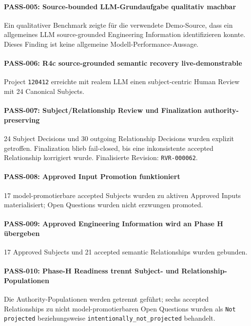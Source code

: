\paragraph{PASS-005: Source-bounded LLM-Grundaufgabe qualitativ machbar}
Ein qualitativer Benchmark zeigte für die verwendete Demo-Source, dass ein
allgemeines LLM source-grounded Engineering Information identifizieren konnte.
Dieses Finding ist keine allgemeine Modell-Performance-Aussage.

\paragraph{PASS-006: R4c source-grounded semantic recovery live-demonstrable}
Project \texttt{120412} erreichte mit realem LLM einen subject-centric Human Review
mit 24 Canonical Subjects.

\paragraph{PASS-007: Subject/Relationship Review und Finalization authority-preserving}
24 Subject Decisions und 30 outgoing Relationship Decisions wurden explizit
getroffen. Finalization blieb fail-closed, bis eine inkonsistente accepted
Relationship korrigiert wurde. Finalisierte Revision: \texttt{RVR-000062}.

\paragraph{PASS-008: Approved Input Promotion funktioniert}
17 model-promotierbare accepted Subjects wurden zu aktiven Approved Inputs
materialisiert; Open Questions wurden nicht erzwungen promoted.

\paragraph{PASS-009: Approved Engineering Information wird an Phase H übergeben}
17 Approved Subjects und 21 accepted semantic Relationships wurden gebunden.

\paragraph{PASS-010: Phase-H Readiness trennt Subject- und Relationship-Populationen}
Die Authority-Populationen werden getrennt geführt; sechs accepted Relationships
zu nicht model-promotierbaren Open Questions wurden als \texttt{Not projected}
beziehungsweise \texttt{intentionally\_not\_projected} behandelt.

